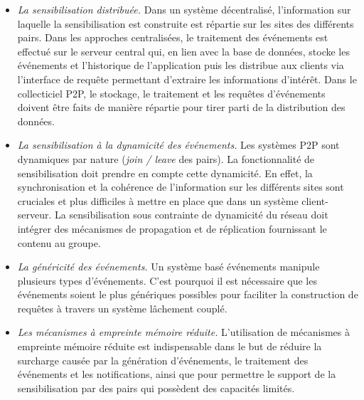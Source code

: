 \begin{itemize}
	\item \textit{La sensibilisation distribuée.} Dans un 
	système décentralisé, l'information sur laquelle la sensibilisation est construite 
	est répartie sur les sites des différents pairs. Dans les approches centralisées, 
	le traitement des événements est effectué sur le serveur central qui, en lien avec la base de données,
	stocke les événements et l'historique de l'application puis les distribue aux clients 
	via l'interface de requête permettant d'extraire les informations d'intérêt. 
	Dans le collecticiel \gls{P2P}, le stockage, le traitement et les requêtes d'événements 
	doivent être faits de manière répartie pour tirer parti de la distribution des données.
	
	\item \textit{La sensibilisation à la dynamicité des événements.} Les systèmes 
	\gls{P2P} 
	sont dynamiques par nature (\textit{join / leave} des pairs). La fonctionnalité de 
	sensibilisation doit prendre en compte cette dynamicité. En effet, la 
	synchronisation et la cohérence de l'information sur les différents sites sont 
	cruciales et plus difficiles à mettre en place que dans un système 
	client-serveur. La sensibilisation sous contrainte de dynamicité du réseau doit 
	intégrer des mécanismes de propagation et de réplication fournissant le contenu 
	au groupe. 
	
	\item \textit{La généricité des événements.} Un système basé événements manipule 
	plusieurs types d'événements. C'est pourquoi il est nécessaire que les 
	événements soient le plus génériques possibles pour faciliter la construction de 
	requêtes à travers un système lâchement couplé.
	
	\item \textit{Les mécanismes à empreinte mémoire réduite.} L'utilisation de 
	mécanismes à empreinte mémoire réduite est indispensable dans le but de 
	réduire la surcharge causée par la génération d'événements, le traitement des 
	événements et les notifications, ainsi que pour permettre le support de la 
	sensibilisation par des pairs qui possèdent des capacités limités.
	
\end{itemize}
%

